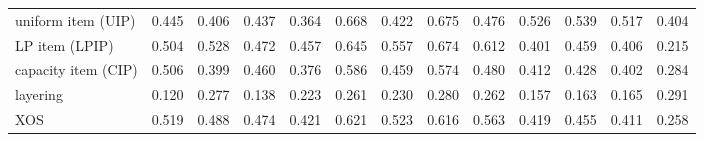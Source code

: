 \begin{table}[tp]
\begin{tabular}{@{}lcccccccccccc@{}}
    uniform item (UIP) & 0.445 & 0.406 & 0.437 & 0.364 & 0.668 & 0.422 & 0.675 & 0.476 & 0.526 & 0.539 & 0.517 & 0.404 \\
    LP item (LPIP) & 0.504 & 0.528 & 0.472 & 0.457 & 0.645 & 0.557 & 0.674 & 0.612 & 0.401 & 0.459 & 0.406 & 0.215 \\
    capacity item (CIP) & 0.506 & 0.399 & 0.460 & 0.376 & 0.586 & 0.459 & 0.574 & 0.480 & 0.412 & 0.428 & 0.402 & 0.284 \\
    layering & 0.120 & 0.277 & 0.138 & 0.223 & 0.261 & 0.230 & 0.280 & 0.262 & 0.157 & 0.163 & 0.165 & 0.291 \\
    XOS & 0.519 & 0.488 & 0.474 & 0.421 & 0.621 & 0.523 & 0.616 & 0.563 & 0.419 & 0.455 & 0.411 & 0.258 \\
    \bottomrule
  \end{tabular}
\end{table}
